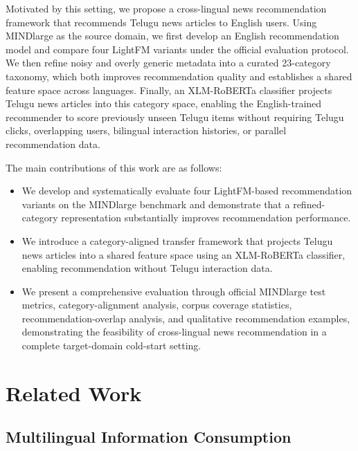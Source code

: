 \documentclass[conference]{IEEEtran}
\begin{document}
Motivated by this setting, we propose a cross-lingual news recommendation framework that recommends Telugu news articles to English users. Using MINDlarge as the source domain, we first develop an English recommendation model and compare four LightFM variants under the official evaluation protocol. We then refine noisy and overly generic metadata into a curated 23-category taxonomy, which both improves recommendation quality and establishes a shared feature space across languages. Finally, an XLM-RoBERTa classifier projects Telugu news articles into this category space, enabling the English-trained recommender to score previously unseen Telugu items without requiring Telugu clicks, overlapping users, bilingual interaction histories, or parallel recommendation data.

The main contributions of this work are as follows:

\begin{itemize}
\item We develop and systematically evaluate four LightFM-based recommendation variants on the MINDlarge benchmark and demonstrate that a refined-category representation substantially improves recommendation performance.

\item We introduce a category-aligned transfer framework that projects Telugu news articles into a shared feature space using an XLM-RoBERTa classifier, enabling recommendation without Telugu interaction data.

\item We present a comprehensive evaluation through official MINDlarge test metrics, category-alignment analysis, corpus coverage statistics, recommendation-overlap analysis, and qualitative recommendation examples, demonstrating the feasibility of cross-lingual news recommendation in a complete target-domain cold-start setting.
\end{itemize}

\section{Related Work}
\subsection{Multilingual Information Consumption}
\end{document}
